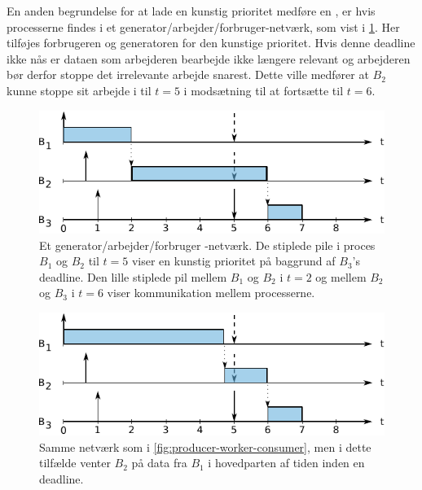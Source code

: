 En anden begrundelse for at lade en kunstig prioritet medføre en , er hvis processerne findes i et generator/arbejder/forbruger-netværk, som vist i \cref{fig:producer-worker-consumer}. Her tilføjes forbrugeren og generatoren for den kunstige prioritet. Hvis denne deadline ikke nås er dataen som arbejderen bearbejde ikke længere relevant og arbejderen bør derfor stoppe det irrelevante arbejde snarest. Dette ville medfører at $B_2$ kunne stoppe sit arbejde i til $t = 5$ i modsætning til at fortsætte til $t = 6$.



\begin{figure}
 \begin{center}
  \includegraphics[scale=1.00]{images/producer-worker-consumer}
  \caption{Et generator/arbejder/forbruger -netværk. De stiplede pile i proces $B_1$ og $B_2$ til $t=5$ viser en kunstig prioritet på baggrund af $B_3$'s deadline. Den lille stiplede pil mellem  $B_1$ og $B_2$ i $t=2$ og mellem $B_2$ og $B_3$ i $t=6$ viser kommunikation mellem processerne.}
  \label{fig:producer-worker-consumer}
  \end{center}
\end{figure}

\begin{figure}
 \begin{center}
  \includegraphics[scale=1.00]{images/producer-worker-consumer2}
  \caption{Samme netværk som i \autoref{fig:producer-worker-consumer}, men i dette tilfælde venter $B_2$  på data fra $B_1$ i hovedparten af tiden inden en deadline.}
  \label{fig:producer-worker-consumer2}
  \end{center}
\end{figure}


